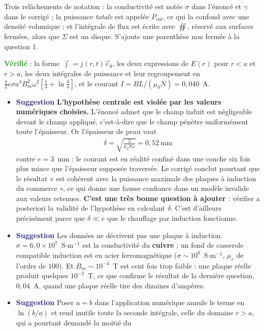 \documentclass[a4paper,11pt]{article}
\newcommand{\suggestion}{\textcolor{MidnightBlue}{\textbf{Suggestion}}}
\newcommand{\verifie}{\textcolor{ForestGreen}{\textbf{Vérifié}}}
\begin{document}
\medskip
Trois relâchements de notation : la conductivité est notée $\sigma$ dans l'énoncé et $\gamma$ dans le
corrigé ; la puissance \textit{totale} est appelée $P_{vol}$, ce qui la confond avec une densité
volumique ; et l'intégrale de flux est écrite avec $\oiint$, réservé aux surfaces fermées, alors que
$\Sigma$ est un disque. S'ajoute une parenthèse non fermée à la question 1.

\medskip
\verifie{} : la forme $\vec\jmath=j(r,t)\vec e_\theta$, les deux expressions de $E(r)$ pour $r<a$ et
$r>a$, les deux intégrales de puissance et leur regroupement en
$\frac{\pi}{2}e\sigma a^4B_m^2\omega^2\left[\frac14+\ln\frac ba\right]$, et le courant
$I=BL/(\mu_0N)=0{,}040$~A.

\begin{itemize}
	\item \suggestion{} \textbf{L'hypothèse centrale est violée par les valeurs numériques choisies.}
	L'énoncé admet que le champ induit est négligeable devant le champ appliqué, c'est-à-dire que le
	champ pénètre uniformément toute l'épaisseur. Or l'épaisseur de peau vaut
	\begin{align*}
		\delta=\sqrt{\frac{2}{\mu_0\sigma\omega}}=0{,}52~\mathrm{mm}
	\end{align*}
	contre $e=3$~mm : le courant est en réalité confiné dans une couche six fois plus mince que
	l'épaisseur supposée traversée. Le corrigé conclut pourtant que le résultat « est cohérent avec la
	puissance maximale des plaques à induction du commerce », ce qui donne une fausse confiance dans un
	modèle invalide aux valeurs retenues. \textbf{C'est une très bonne question à ajouter} : vérifier a
	posteriori la validité de l'hypothèse en calculant $\delta$. C'est d'ailleurs précisément parce que
	$\delta\ll e$ que le chauffage par induction fonctionne.
	\item \suggestion{} Les données ne décrivent pas une plaque à induction. $\sigma=6{,}0\times10^{7}$~S$\cdot$m$^{-1}$
	est la conductivité du \textbf{cuivre} ; un fond de casserole compatible induction est en acier
	ferromagnétique ($\sigma\sim10^{6}$~S$\cdot$m$^{-1}$, $\mu_r$ de l'ordre de $100$). Et
	$B_m\sim10^{-4}$~T est cent fois trop faible : une plaque réelle produit quelques $10^{-2}$~T, ce
	que confirme le résultat de la dernière question, $0{,}04$~A, quand une plaque réelle tire des
	dizaines d'ampères.
	\item \suggestion{} Poser $a=b$ dans l'application numérique annule le terme en $\ln(b/a)$ et rend
	inutile toute la seconde intégrale, celle du domaine $r>a$, qui a pourtant demandé la moitié du

\end{itemize}
\end{document}
